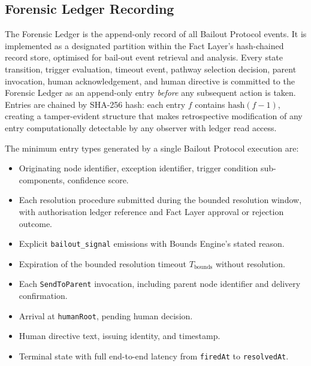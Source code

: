 \subsection{Forensic Ledger Recording}
\label{sec:forensic-ledger-recording}

The Forensic Ledger is the append-only record of all Bailout Protocol events. It is implemented as a designated partition within the Fact Layer's hash-chained record store, optimised for bail-out event retrieval and analysis. Every state transition, trigger evaluation, timeout event, pathway selection decision, parent invocation, human acknowledgement, and human directive is committed to the Forensic Ledger as an append-only entry \emph{before} any subsequent action is taken. Entries are chained by SHA-256 hash: each entry $f$ contains $\text{hash}(f-1)$, creating a tamper-evident structure that makes retrospective modification of any entry computationally detectable by any observer with ledger read access.

The minimum entry types generated by a single Bailout Protocol execution are:

\begin{itemize}\itemsep=0pt
\item[\texttt{bailout-trigger}] Originating node identifier, exception identifier, trigger condition sub-components, confidence score.
\item[\texttt{bounds-resolution-attempt}] Each resolution procedure submitted during the bounded resolution window, with authorisation ledger reference and Fact Layer approval or rejection outcome.
\item[\texttt{bailout-signal}] Explicit \texttt{bailout\_signal} emissions with Bounds Engine's stated reason.
\item[\texttt{timeout-bounds-expired}] Expiration of the bounded resolution timeout $T_{\text{bounds}}$ without resolution.
\item[\texttt{parent-escalation}] Each \texttt{SendToParent} invocation, including parent node identifier and delivery confirmation.
\item[\texttt{human-acknowledged}] Arrival at \texttt{humanRoot}, pending human decision.
\item[\texttt{human-directive}] Human directive text, issuing identity, and timestamp.
\item[\texttt{resolved}] Terminal state with full end-to-end latency from \texttt{firedAt} to \texttt{resolvedAt}.
\end{itemize}

